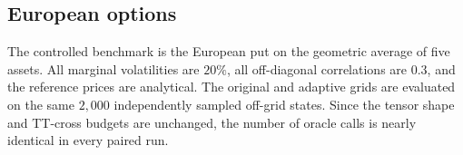 \documentclass{article}
\numberwithin{equation}{subsection}
\theoremstyle{definition}
\theoremstyle{remark}
\begin{document}
\subsection{European options}
\label{subsec:european-results}
The controlled benchmark is the European put on the geometric average of five
assets. All marginal volatilities are \(20\%\), all off-diagonal correlations
are \(0.3\), and the reference prices are analytical. The original and adaptive
grids are evaluated on the same \(2{,}000\) independently sampled off-grid
states. Since the tensor shape and TT-cross budgets are unchanged, the number
of oracle calls is nearly identical in every paired run.
\begin{table}[H]
    \centering
    \caption{European geometric-basket put results. Prediction time is the
    measured mean wall-clock time per off-grid query. The TT-ANOVA
    initialization evaluations are included in the oracle counts.}
    \label{tab:european-grid-results}
\end{table}
\end{document}
